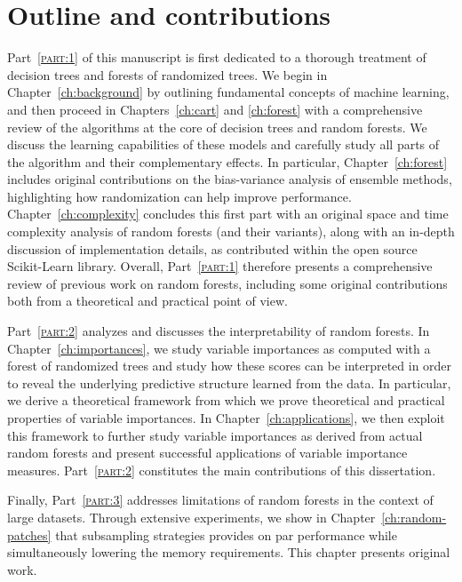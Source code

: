 \section{Outline and contributions}

Part~\textsc{\ref{part:1}} of this manuscript is first dedicated to a thorough
treatment of decision trees and forests of randomized trees. We begin in
Chapter~\ref{ch:background} by outlining fundamental concepts of machine
learning, and then proceed in Chapters~\ref{ch:cart} and \ref{ch:forest} with a
comprehensive review of the algorithms at the core of decision trees and random
forests. We discuss the learning capabilities of these models and carefully
study all parts of the algorithm and their complementary effects. In particular,
Chapter~\ref{ch:forest} includes original contributions on the bias-variance
analysis of ensemble methods, highlighting how randomization can help improve
performance. Chapter~\ref{ch:complexity} concludes this first part with an
original space and time complexity analysis of random forests (and their
variants), along with an in-depth discussion of implementation details,
as contributed within the open source Scikit-Learn library.
Overall, Part~\textsc{\ref{part:1}} therefore presents a comprehensive review
of previous work on random forests, including some original contributions
both from a theoretical and practical point of view.

Part~\textsc{\ref{part:2}} analyzes and discusses the interpretability of
random forests. In Chapter~\ref{ch:importances}, we study variable importances
as computed with a forest of randomized trees and study how these scores can be
interpreted in order to reveal the underlying predictive structure learned from
the data. In particular, we derive a theoretical framework from which we prove
theoretical and practical properties of variable importances. In
Chapter~\ref{ch:applications}, we then exploit this framework to further study
variable importances as derived from actual random forests and present
successful applications of variable importance measures.
Part~\textsc{\ref{part:2}} constitutes the main contributions of this
dissertation.

Finally, Part~\textsc{\ref{part:3}} addresses limitations of random forests in
the context of large datasets. Through extensive experiments, we show in
Chapter~\ref{ch:random-patches} that subsampling strategies provides on par
performance while simultaneously lowering the memory requirements. This
chapter presents original work.

